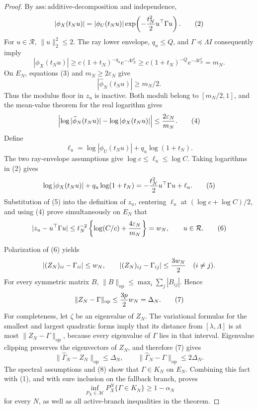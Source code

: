 \documentclass{article}
\begin{document}
\begin{proof}
By \(\mathrm{ass:additive\text{-}decomposition}\) and independence,
\[
 |\phi_X(t_Nu)|=|\phi_U(t_Nu)|
 \exp\!\left(-{t_N^2\over2}u^\top\Gamma u\right). \tag{2}
\]
For \(u\in\mathcal R\), \(\|u\|_2^2\le2\).  The ray lower envelope, \(q_u\le Q\), and \(\Gamma\preceq\Lambda I\) consequently imply
\[
 |\phi_X(t_Nu)|
 \ge c(1+t_N)^{-q_u}e^{-\Lambda t_N^2}
 \ge c(1+t_N)^{-Q}e^{-\Lambda t_N^2}=m_N. \tag{3}
\]
On \(E_N\), equations (3) and \(m_N\ge2\varepsilon_N\) give
\[
 |\widehat\phi_N(t_Nu)|\ge m_N/2.
\]
Thus the modulus floor in \(z_u\) is inactive.  Both moduli belong to \([m_N/2,1]\), and the mean-value theorem for the real logarithm gives
\[
 \left|\log|\widehat\phi_N(t_Nu)|-\log|\phi_X(t_Nu)|\right|
 \le {2\varepsilon_N\over m_N}. \tag{4}
\]
Define
\[
 \ell_u=\log|\phi_U(t_Nu)|+q_u\log(1+t_N).
\]
The two ray-envelope assumptions give \(\log c\le\ell_u\le\log C\).  Taking logarithms in (2) gives
\[
 \log|\phi_X(t_Nu)|+q_u\log(1+t_N)
 =-{t_N^2\over2}u^\top\Gamma u+\ell_u. \tag{5}
\]
Substitution of (5) into the definition of \(z_u\), centering \(\ell_u\) at \((\log c+\log C)/2\), and using (4) prove simultaneously on \(E_N\) that
\[
 |z_u-u^\top\Gamma u|
 \le t_N^{-2}\left\{\log(C/c)+{4\varepsilon_N\over m_N}\right\}
 =w_N,
 \qquad u\in\mathcal R. \tag{6}
\]

Polarization of (6) yields
\[
 |(Z_N)_{ii}-\Gamma_{ii}|\le w_N,
 \qquad
 |(Z_N)_{ij}-\Gamma_{ij}|\le{3w_N\over2}\quad(i\ne j).
\]
For every symmetric matrix \(B\), \(\|B\|_{\mathrm{op}}\le\max_i\sum_j|B_{ij}|\).  Hence
\[
 \|Z_N-\Gamma\|_{\mathrm{op}}
 \le {3p\over2}w_N=\Delta_N. \tag{7}
\]
For completeness, let \(\zeta\) be an eigenvalue of \(Z_N\).  The variational formulas for the smallest and largest quadratic forms imply that its distance from \([\lambda,\Lambda]\) is at most \(\|Z_N-\Gamma\|_{\mathrm{op}}\), because every eigenvalue of \(\Gamma\) lies in that interval.  Eigenvalue clipping preserves the eigenvectors of \(Z_N\), and therefore (7) gives
\[
 \|\widehat\Gamma_N-Z_N\|_{\mathrm{op}}\le\Delta_N,
 \qquad
 \|\widehat\Gamma_N-\Gamma\|_{\mathrm{op}}\le2\Delta_N. \tag{8}
\]
The spectral assumptions and (8) show that \(\Gamma\in K_N\) on \(E_N\).  Combining this fact with (1), and with sure inclusion on the fallback branch, proves
\[
 \inf_{P_X\in\mathcal M}P_X^N\{\Gamma\in K_N\}\ge1-\alpha_N
\]
for every \(N\), as well as all active-branch inequalities in the theorem.


\end{proof}
\end{document}
